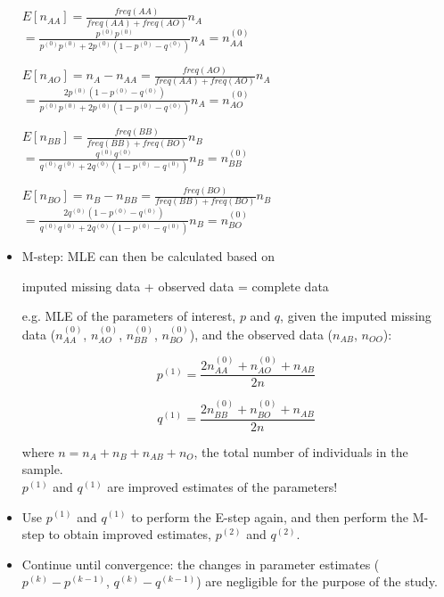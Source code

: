 \documentclass[10pt]{beamer}
\begin{document}
\begin{frame}
\begin{itemize}
{\small
$E[n_{AA}] = \frac{freq(AA)}{freq(AA)+freq(AO)} n_A $\\
\hspace*{1.8cm}
$=\frac{p^{(0)}p^{(0)}}{p^{(0)}p^{(0)}+2p^{(0)}(1-p^{(0)}-q^{(0)})} n_A = n_{AA}^{(0)}$ \\
\bigskip

$E[n_{AO}] = n_A-n_{AA} = \frac{freq(AO)}{freq(AA)+freq(AO)} n_A$\\
\hspace*{1.8cm}
$=\frac{2p^{(0)}(1-p^{(0)}-q^{(0)})}{p^{(0)}p^{(0)}+2p^{(0)}(1-p^{(0)}-q^{(0)})} n_A = n_{AO}^{(0)}$ \\
\bigskip
\bigskip

$E[n_{BB}] = \frac{freq(BB)}{freq(BB)+freq(BO)} n_B $\\
\hspace*{1.8cm}
$=\frac{q^{(0)}q^{(0)}}{q^{(0)}q^{(0)}+2q^{(0)}(1-p^{(0)}-q^{(0)})} n_B = n_{BB}^{(0)}$ \\
\bigskip

$E[n_{BO}] = n_B-n_{BB} = \frac{freq(BO)}{freq(BB)+freq(BO)} n_B$\\
\hspace*{1.8cm}
$=\frac{2q^{(0)}(1-p^{(0)}-q^{(0)})}{q^{(0)}q^{(0)}+2q^{(0)}(1-p^{(0)}-q^{(0)})} n_B = n_{BO}^{(0)}$ \\
}
\pagebreak

\item M-step: MLE can then be calculated based on 
\centerline{imputed missing data + observed data = complete data}
\smallskip

e.g. MLE of the parameters of interest, $p$ and $q$, given the imputed missing data
($n_{AA}^{(0)}$, $n_{AO}^{(0)}$, $n_{BB}^{(0)}$, $n_{BO}^{(0)}$), and
 the observed data ($n_{AB}$, $n_{OO}$):

$$p^{(1)} = \frac{2n_{AA}^{(0)}+n_{AO}^{(0)}+n_{AB}}{2n}$$

$$q^{(1)} = \frac{2n_{BB}^{(0)}+n_{BO}^{(0)}+n_{AB}}{2n}$$
\bigskip

where $n=n_{A}+n_{B}+n_{AB}+n_{O}$, the total number of individuals in the sample.\\

$p^{(1)}$ and $q^{(1)}$ are improved estimates of the parameters!
\pagebreak

\item Use $p^{(1)}$ and $q^{(1)}$ to perform the E-step again, and then perform the M-step to obtain improved estimates, 
$p^{(2)}$ and $q^{(2)}$.
\smallskip

\item Continue until convergence: the changes in parameter estimates ($p^{(k)}-p^{(k-1)}$, $q^{(k)}-q^{(k-1)}$) are negligible for the purpose
of the study.
\bigskip


\end{itemize}
\end{frame}
\end{document}
